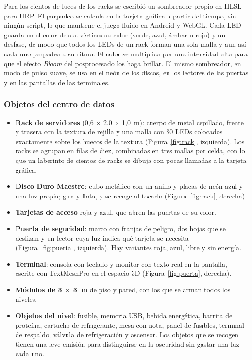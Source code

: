 Para los cientos de luces de los racks se escribió un sombreador propio en HLSL para URP. El
parpadeo se calcula en la tarjeta gráfica a partir del tiempo, sin ningún script, lo que mantiene
el juego fluido en Android y WebGL. Cada LED guarda en el color de sus vértices su color (verde,
azul, ámbar o rojo) y un desfase, de modo que todos los LEDs de un rack forman una sola malla y aun
así cada uno parpadea a su ritmo. El color se multiplica por una intensidad alta para que el efecto
\textit{Bloom} del posprocesado los haga brillar. El mismo sombreador, en modo de pulso suave, se
usa en el neón de los discos, en los lectores de las puertas y en las pantallas de las terminales.

\subsubsection{Objetos del centro de datos}

\begin{itemize}
  \item \textbf{Rack de servidores} (0,6 × 2,0 × 1,0~m): cuerpo de metal cepillado, frente y
        trasera con la textura de rejilla y una malla con 80 LEDs colocados exactamente sobre los
        huecos de la textura (Figura~\ref{fig:rack}, izquierda). Los racks se agrupan en filas de diez,
        combinadas en tres mallas por celda, con lo que un laberinto de cientos de racks se dibuja
        con pocas llamadas a la tarjeta gráfica.
  \item \textbf{Disco Duro Maestro}: cubo metálico con un anillo y placas de neón azul y una luz
        propia; gira y flota, y se recoge al tocarlo (Figura~\ref{fig:rack}, derecha).
  \item \textbf{Tarjetas de acceso} roja y azul, que abren las puertas de su color.
  \item \textbf{Puerta de seguridad}: marco con franjas de peligro, dos hojas que se deslizan y un
        lector cuya luz indica qué tarjeta se necesita (Figura~\ref{fig:puerta}, izquierda). Hay variantes
        roja, azul, libre y sin energía.
  \item \textbf{Terminal}: consola con teclado y monitor con texto real en la pantalla, escrito con
        TextMeshPro en el espacio 3D (Figura~\ref{fig:puerta}, derecha).
  \item \textbf{Módulos de 3 × 3~m} de piso y pared, con los que se arman todos los niveles.
  \item \textbf{Objetos del nivel}: fusible, memoria USB, bebida energética, barrita de proteína,
        cartucho de refrigerante, mesa con nota, panel de fusibles, terminal de respaldo, válvula de
        refrigeración y ascensor. Los objetos que se recogen tienen una leve emisión para distinguirse
        en la oscuridad sin gastar una luz cada uno.
\end{itemize}

